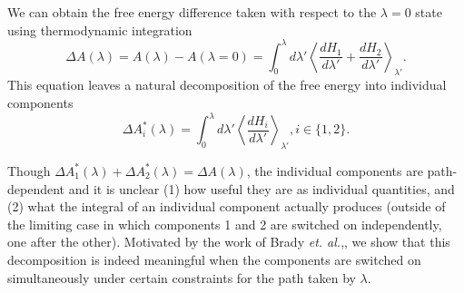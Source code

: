 \documentclass[%
 preprint,
 amsmath,amssymb,
 aps,
]{revtex4-1}
\begin{document}
We can obtain the free energy difference taken with respect to the $\lambda=0$ state using thermodynamic integration\cite{NULL}
\begin{equation}
\Delta A (\lambda)= A(\lambda)-A(\lambda=0)  = \int_0^{\lambda} d \lambda'
\left\langle \frac{dH_1}{d \lambda'} +  \frac{dH_2}{d \lambda'}  \right \rangle_{\lambda'}.
\label{e:TI}
\end{equation}
This equation leaves a natural decomposition of the free energy into individual components
\begin{equation}
\Delta A^*_i  (\lambda) = \int_0^{\lambda} d \lambda' 
\left\langle \frac{dH_i}{d \lambda'} \right \rangle_{\lambda'}, i \in \{ 1,2 \}.
\label{e:TIcomps}
\end{equation}
 
Though $\Delta A^*_1  (\lambda)+ \Delta A^*_2  (\lambda)= \Delta A (\lambda)$, the individual components are path-dependent and it is unclear (1) how useful they are as individual quantities, and (2) what the integral of an individual component actually produces (outside of the limiting case in which components 1 and 2 are switched on independently, one after the other).  Motivated by the work of Brady \emph{et. al.},\cite{NULL}, we show that this decomposition is indeed meaningful when the components are switched on simultaneously under certain constraints for the path taken by $\lambda$.
\end{document}
